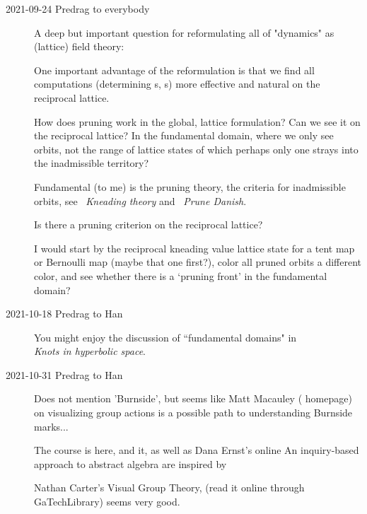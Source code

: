 \begin{description}
\item[2021-09-24 Predrag to everybody]
A deep but important question for reformulating all of "dynamics"
as (lattice) field theory:

One important advantage of the reformulation is that we find all
computations (determining {\lattstate}s, \HillDet s) more effective and
natural on the reciprocal lattice.

How does pruning work in the global, lattice formulation? Can we see it
on the reciprocal lattice? In the fundamental domain, where we only see
orbits, not the range of lattice states of which perhaps only one strays
into the inadmissible territory?

Fundamental (to me) is the pruning theory, the criteria for inadmissible
orbits, see
~{\em Kneading theory}
and
~{\em Prune Danish}.

Is there a pruning criterion on the reciprocal lattice?

I would start by the reciprocal kneading value lattice state for a tent
map or Bernoulli map (maybe that one first?), color all pruned orbits a
different color, and see whether there is a `pruning front' in
the fundamental domain?


\item[2021-10-18 Predrag to Han]
You might enjoy the discussion of ``fundamental domains" in\\
 {\em Knots in hyperbolic space}.

\item[2021-10-31 Predrag to Han]                        \inCB

Does not mention 'Burnside', but seems like
{Matt Macauley}
( {homepage}) on visualizing
group actions is a possible path to understanding Burnside marks...

The course is
{here}, and it, as well as Dana Ernst's online
{An inquiry-based approach to abstract algebra} are inspired by

Nathan Carter's 
{Visual Group Theory},
(read it online through 
{GaTechLibrary}) seems very good.


\end{description}
